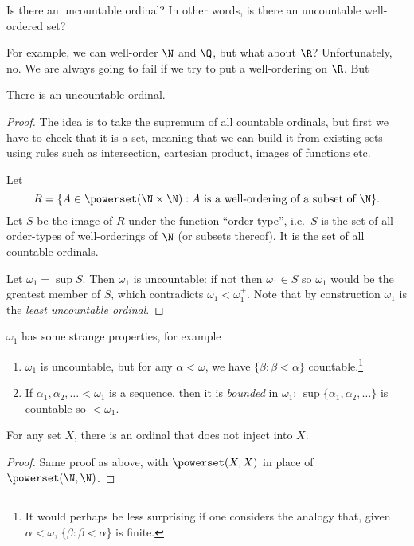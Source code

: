\documentclass[a4paper]{article}
\begin{document}
Is there an uncountable ordinal? In other words, is there an uncountable well-ordered set?

For example, we can well-order \(\N\) and \(\Q\), but what about \(\R\)? Unfortunately, no. We are always going to fail if we try to put a well-ordering on \(\R\). But

\begin{theorem}
  There is an uncountable ordinal.
\end{theorem}

\begin{proof}
  The idea is to take the supremum of all countable ordinals, but first we have to check that it is a set, meaning that we can build it from existing sets using rules such as intersection, cartesian product, images of functions etc.

  Let
  \[
    R = \{A \in \powerset(\N \times \N): A \text{ is a well-ordering of a subset of } \N\}.
  \]
  Let \(S\) be the image of \(R\) under the function ``order-type'', i.e.\ \(S\) is the set of all order-types of well-orderings of \(\N\) (or subsets thereof). It is the set of all countable ordinals.

  Let \(\omega_1 = \sup S\). Then \(\omega_1\) is uncountable: if not then \(\omega_1 \in S\) so \(\omega_1\) would be the greatest member of \(S\), which contradicts \(\omega_1 < \omega_1^+\). Note that by construction \(\omega_1\) is the \emph{least uncountable ordinal}.
\end{proof}

\(\omega_1\) has some strange properties, for example
\begin{enumerate}
\item \(\omega_1\) is uncountable, but for any \(\alpha < \omega\), we have \(\{\beta: \beta < \alpha\}\) countable.\footnote{It would perhaps be less surprising if one considers the analogy that, given \(\alpha < \omega\), \(\{\beta: \beta < \alpha\}\) is finite.}
\item If \(\alpha_1, \alpha_2, \dots < \omega_1\) is a sequence, then it is \emph{bounded} in \(\omega_1\): \(\sup\{\alpha_1, \alpha_2, \dots\}\) is countable so \(< \omega_1\).
\end{enumerate}

\begin{theorem}
  For any set \(X\), there is an ordinal that does not inject into \(X\).
\end{theorem}

\begin{proof}
  Same proof as above, with \(\powerset(X, X)\) in place of \(\powerset(\N, \N)\).
\end{proof}
\end{document}
